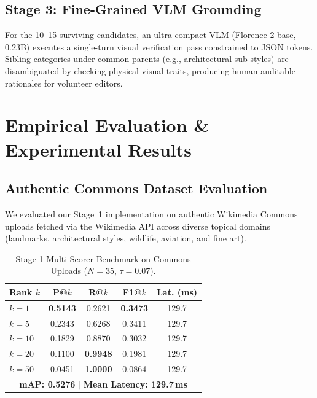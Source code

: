 \documentclass[10pt,a4paper,twocolumn]{article}
\begin{document}
\subsection{Stage 3: Fine-Grained VLM Grounding}
For the 10--15 surviving candidates, an ultra-compact VLM (Florence-2-base, 0.23B) executes a single-turn visual verification pass constrained to JSON tokens. Sibling categories under common parents (e.g., architectural sub-styles) are disambiguated by checking physical visual traits, producing human-auditable rationales for volunteer editors.

\section{Empirical Evaluation \& Experimental Results}

\subsection{Authentic Commons Dataset Evaluation}
We evaluated our Stage~1 implementation on authentic Wikimedia Commons uploads fetched via the Wikimedia API across diverse topical domains (landmarks, architectural styles, wildlife, aviation, and fine art).

\begin{table}[h]
\centering
\footnotesize
\caption{Stage 1 Multi-Scorer Benchmark on Commons Uploads ($N=35$, $\tau=0.07$).}
\vspace{1.5pt}
\begin{tabularx}{\columnwidth}{lcccc}
\toprule
\textbf{Rank $k$} & \textbf{P@$k$} & \textbf{R@$k$} & \textbf{F1@$k$} & \textbf{Lat. (ms)} \\
\midrule
$k=1$  & \textbf{0.5143} & 0.2621 & \textbf{0.3473} & 129.7 \\
$k=5$  & 0.2343 & 0.6268 & 0.3411 & 129.7 \\
$k=10$ & 0.1829 & 0.8870 & 0.3032 & 129.7 \\
$k=20$ & 0.1100 & \textbf{0.9948} & 0.1981 & 129.7 \\
$k=50$ & 0.0451 & \textbf{1.0000} & 0.0864 & 129.7 \\
\midrule
\multicolumn{5}{c}{\textbf{mAP: 0.5276} \quad $\vert$ \quad \textbf{Mean Latency: 129.7\,ms}} \\
\bottomrule
\end{tabularx}
\end{table}
\end{document}
